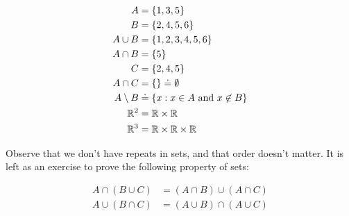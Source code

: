 \begin{example}
\begin{equation*}
\begin{split}
	A & = \{1,3,5\} \\
	B & = \{2,4,5,6\} \\
	A \cup B &= \{1,2,3,4,5,6\} \\
	A \cap B & = \{5\} \\
	C & = \{2,4,5\} \\
	A \cap C & = \{\} \doteq \emptyset \\
	A \setminus B & \doteq \{ x: x \in A \text{ and } x \not \in B\} \\
	\mathbb{R}^{2} & = \mathbb{R} \times \mathbb{R} \\
	\mathbb{R}^{3} & = \mathbb{R} \times \mathbb{R} \times \mathbb{R}
\end{split}
\end{equation*}
\end{example}
Observe that we don't have repeats in sets, and that order doesn't matter.
It is left as an exercise to prove the following property of sets:
\begin{lemma}
\begin{equation*}
\begin{split}
	A \cap (B \cup C) &= (A \cap B)  \cup (A \cap C) \\
	A \cup (B \cap C) &= (A \cup B)  \cap (A \cup C) 
\end{split}
\end{equation*}
\end{lemma}
